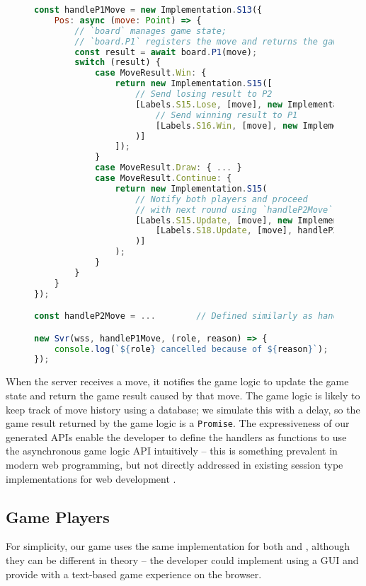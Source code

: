 \begin{figure}[!h]
\begin{lstlisting}[language=javascript,tabsize=2]
const handleP1Move = new Implementation.S13({
	Pos: async (move: Point) => {
		// `board` manages game state;
		// `board.P1` registers the move and returns the game result
		const result = await board.P1(move);
		switch (result) {
			case MoveResult.Win: {
				return new Implementation.S15([
					// Send losing result to P2
					[Labels.S15.Lose, [move], new Implementation.S16(
						// Send winning result to P1
						[Labels.S16.Win, [move], new Implementation.Terminal()]
					)]
				]);
			}
			case MoveResult.Draw: { ... }
			case MoveResult.Continue: {
				return new Implementation.S15(
					// Notify both players and proceed
					// with next round using `handleP2Move`
					[Labels.S15.Update, [move], new Implementation.S18(
						[Labels.S18.Update, [move], handleP2Move]
					)]
				);	
			}		
		}
	}
});

const handleP2Move = ...		// Defined similarly as handleP1Move

new Svr(wss, handleP1Move, (role, reason) => {
	console.log(`${role} cancelled because of ${reason}`);
});
\end{lstlisting}
\label{lst:gamesvr}
\end{figure}

When the server receives a move, it notifies
the game logic to update the game state and return the game
result caused by that move.
The game logic is likely to keep track of move history
using a database; we simulate this with a delay, so 
the game result returned by the game logic is a \texttt{Promise}.
The expressiveness of our generated APIs enable the developer
to define the handlers as  functions
to use the asynchronous game logic API intuitively -- this is something
prevalent in modern web programming, but not directly addressed in existing
session type implementations for web development \cite{PureScript2019,MVU2020}.

\subsection{Game Players}
For simplicity, our game uses the same implementation for both
 and , although they can be different in theory --
the developer could implement  using a GUI and provide
 with a text-based game experience on the browser.

